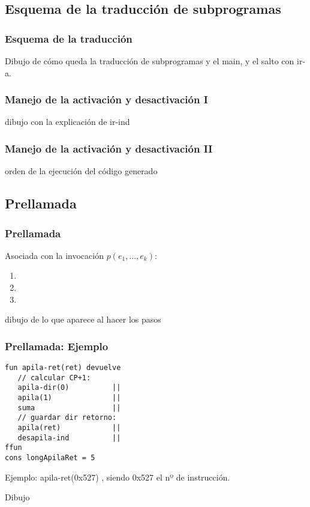 \documentclass[hyperref={pdfpagelabels=false},tree-dvips]{beamer}
\begin{document}
\subsection{Esquema de la traducción de subprogramas}
\begin{frame}[fragile]
\frametitle{Esquema de la traducción}

Dibujo de cómo queda la traducción de subprogramas y el main, y el salto con ir-a.

\end{frame}
\begin{frame}[fragile]
\frametitle{Manejo de la activación y desactivación I}

dibujo con la explicación de ir-ind

\end{frame}
\begin{frame}[fragile]
\frametitle{Manejo de la activación y desactivación II}

orden de la ejecución del código generado

\end{frame}
\subsection{Prellamada}
\begin{frame}[fragile]
\frametitle{Prellamada}

Asociada con la invocación $p(e_1,...,e_k)$:
\begin{enumerate}[<+->]
	\item
	\item
	\item
\end{enumerate}

dibujo de lo que aparece al hacer los pasos


\end{frame}
\begin{frame}[fragile]
\frametitle{Prellamada: Ejemplo}

\begin{lstlisting}[style=codigoMP]
fun apila-ret(ret) devuelve
   // calcular CP+1:
   apila-dir(0)          ||
   apila(1)              ||
   suma                  ||
   // guardar dir retorno:
   apila(ret)            ||
   desapila-ind          ||
ffun
cons longApilaRet = 5
\end{lstlisting}

Ejemplo: apila-ret(0x527) , siendo 0x527 el nº de instrucción.

Dibujo

\end{frame}
\end{document}
